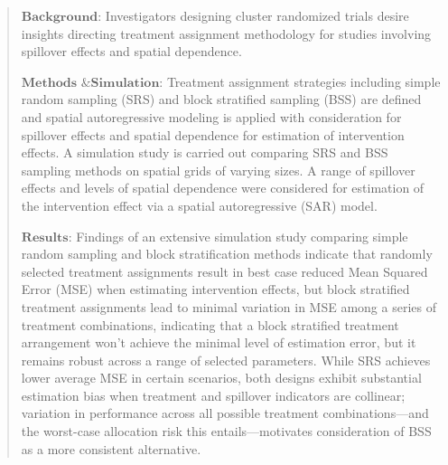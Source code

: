 \documentclass{article}[11pt]
\begin{document}
\begin{abstract}
   $\textbf{Background}$: Investigators designing cluster randomized trials desire insights directing treatment assignment methodology for studies involving spillover effects and spatial dependence.



   $\textbf{Methods \& Simulation}$: Treatment assignment strategies including simple random sampling (SRS) and block stratified sampling (BSS) are defined and spatial autoregressive modeling is applied with consideration for spillover effects and spatial dependence for estimation of intervention effects. A simulation study is carried out comparing SRS and BSS sampling methods on spatial grids of varying sizes. A range of spillover effects and levels of spatial dependence were considered for estimation of the intervention effect via a spatial autoregressive (SAR) model.


   $\textbf{Results}$: Findings of an extensive simulation study comparing simple random sampling and block stratification methods indicate that randomly selected treatment assignments result in best case reduced Mean Squared Error (MSE) when estimating intervention effects, but block stratified treatment assignments lead to minimal variation in MSE among a series of treatment combinations, indicating that a block stratified treatment arrangement won’t achieve the minimal level of estimation error, but it remains robust across a range of selected parameters. While SRS achieves lower average MSE in certain scenarios, both designs exhibit substantial estimation bias when treatment and spillover indicators are collinear; variation in performance across all possible treatment combinations---and the worst-case allocation risk this entails---motivates consideration of BSS as a more consistent alternative.


\end{abstract}
\end{document}

